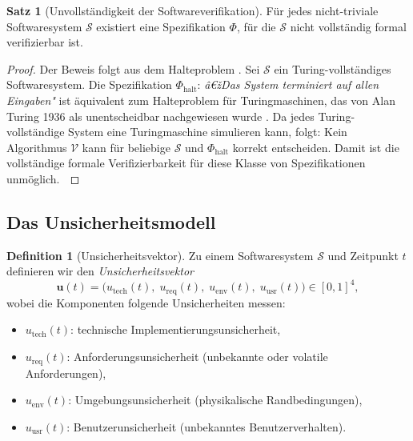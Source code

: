 ﻿\documentclass[a4paper,12pt]{article}
\theoremstyle{definition}
\newtheorem{definition}{Definition}
\newtheorem{satz}{Satz}
\newenvironment{beweis}{\begin{proof}}{\end{proof}}
\begin{document}
\begin{satz}[Unvollst\"andigkeit der Softwareverifikation]
\label{satz:unvollstaendigkeit}
    F\"ur jedes nicht-triviale Softwaresystem $\mathcal{S}$ existiert eine Spezifikation
    $\Phi$, f\"ur die $\mathcal{S}$ nicht vollst\"andig formal verifizierbar ist.
\end{satz}

\begin{beweis}
    Der Beweis folgt aus dem Halteproblem \cite{turing1936}. Sei $\mathcal{S}$ ein Turing-vollst\"andiges
    Softwaresystem. Die Spezifikation $\Phi_{\mathrm{halt}}$: \emph{â€žDas System terminiert
    auf allen Eingaben"} ist \"aquivalent zum Halteproblem f\"ur Turingmaschinen, das von
    Alan Turing 1936 als unentscheidbar nachgewiesen wurde \cite{turing1936}. Da jedes
    Turing-vollst\"andige System eine Turingmaschine simulieren kann, folgt: Kein Algorithmus
    $\mathcal{V}$ kann f\"ur beliebige $\mathcal{S}$ und $\Phi_{\mathrm{halt}}$ korrekt
    entscheiden. Damit ist die vollst\"andige formale Verifizierbarkeit f\"ur diese Klasse
    von Spezifikationen unm\"oglich. $\qedhere$
\end{beweis}

\subsection{Das Unsicherheitsmodell}

\begin{definition}[Unsicherheitsvektor]
    Zu einem Softwaresystem $\mathcal{S}$ und Zeitpunkt $t$ definieren wir den
    \emph{Unsicherheitsvektor}
    \[
        \mathbf{u}(t) = \bigl(u_{\mathrm{tech}}(t),\; u_{\mathrm{req}}(t),\;
                              u_{\mathrm{env}}(t),\; u_{\mathrm{usr}}(t)\bigr) \in [0,1]^4,
    \]
    wobei die Komponenten folgende Unsicherheiten messen:
    \begin{itemize}
        \item $u_{\mathrm{tech}}(t)$: technische Implementierungsunsicherheit,
        \item $u_{\mathrm{req}}(t)$: Anforderungsunsicherheit (unbekannte oder volatile
              Anforderungen),
        \item $u_{\mathrm{env}}(t)$: Umgebungsunsicherheit (physikalische Randbedingungen),
        \item $u_{\mathrm{usr}}(t)$: Benutzerunsicherheit (unbekanntes Benutzerverhalten).
    \end{itemize}
\end{definition}
\end{document}
